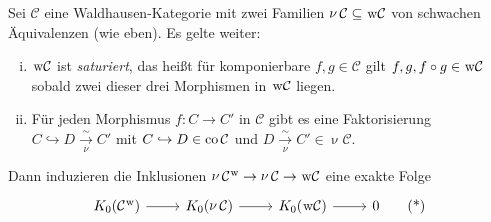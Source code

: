 \begin{satz}[{name={Lokalisierungssatz für K0}}]
	Sei $\mathcal{C}$ eine Waldhausen-Kategorie mit zwei Familien $\mathop{\nu} \mathcal{C} \subseteq \mkern1mu\mathrm{w} \mathcal{C}$ von schwachen Äquivalenzen (wie eben).
	Es gelte weiter:
	\begin{enumerate}[(i)]
		\item $\mkern1mu\mathrm{w} \mathcal{C}$ ist \emph{saturiert}, das heißt für komponierbare $f,g \in \mathcal{C}$ gilt $f,g,f \circ g \in \mkern1mu\mathrm{w} \mathcal{C}$ sobald zwei dieser drei Morphismen in $\mkern1mu\mathrm{w} \mathcal{C}$ liegen.
		\item Für jeden Morphismus $f \colon C \to C'$ in $\mathcal{C}$ gibt es eine Faktorisierung $C \hookrightarrow D \xrightarrow[\nu]{\sim} C'$ mit $C \hookrightarrow D \in \operatorname{co} \mathcal{C}$ und $D \xrightarrow[\nu]{\sim} C' \in \mathop{\nu} \mathcal{C}$.
	\end{enumerate}
	Dann induzieren die Inklusionen $\mathop{\nu} \mathcal{C}^{\mkern1mu\mathrm{w}} \to \mathop{\nu} \mathcal{C} \to \mkern1mu\mathrm{w} \mathcal{C}$ eine exakte Folge
	\begin{equation}
		\begin{tikzcd}
			K_0(\mathcal{C}^{\w}) \rar & K_0(\mathop{\nu} \mathcal{C}) \rar & K_0(\w \mathcal{C}) \rar & 0 \label{eq:lokalisierung} \tag{*}
		\end{tikzcd}
	\end{equation}
\end{satz}
